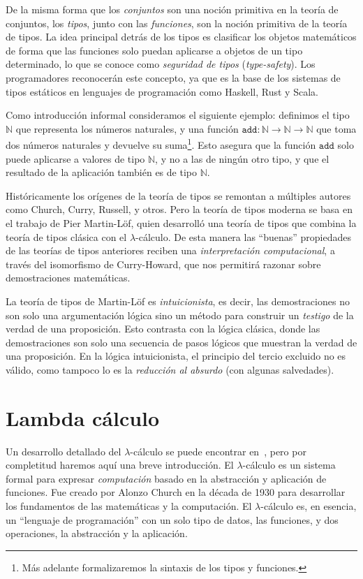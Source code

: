\documentclass[
  a4paper, 
  10pt, 
  parskip=half, 
  toc=bibliography,
]{scrbook}
\theoremstyle{definition}
\theoremstyle{bolddef}
\begin{document}
De la misma forma que los \emph{conjuntos} son una noción primitiva en la teoría de conjuntos,
los \emph{tipos}, junto con las \emph{funciones}, son la noción primitiva de la teoría de tipos.
La idea principal detrás de los tipos es clasificar los objetos matemáticos de
forma que las funciones solo puedan aplicarse a objetos de un tipo determinado,
lo que se conoce como \emph{seguridad de tipos} (\emph{type-safety}). 
Los programadores reconocerán este concepto, ya que es la base de los sistemas de tipos
estáticos en lenguajes de programación como Haskell, Rust y Scala.

Como introducción informal consideramos el siguiente ejemplo: definimos el tipo
\(\mathbb{N}\) que representa los números naturales, y una función
\(\texttt{add}: \mathbb{N} \to \mathbb{N} \to \mathbb{N}\) que toma dos números
naturales y devuelve su suma\footnote{Más adelante formalizaremos la sintaxis de los tipos y funciones.}. 
Esto asegura que la función \(\texttt{add}\) solo puede aplicarse a valores de 
tipo \(\mathbb{N}\), y no a las de ningún otro tipo, y que el resultado de la aplicación
también es de tipo \(\mathbb{N}\).

Históricamente los orígenes de la teoría de tipos se remontan a múltiples
autores como Church, Curry, Russell, y otros. Pero la teoría de tipos moderna se basa en el
trabajo de Pier Martin-Löf, quien desarrolló una teoría de tipos que combina la
teoría de tipos clásica con el \(\lambda\)-cálculo. De esta manera las
\enquote{buenas} propiedades de las teorías de tipos anteriores reciben una
\emph{interpretación computacional}, a través del isomorfismo de Curry-Howard,
que nos permitirá razonar sobre demostraciones matemáticas. 

La teoría de tipos de Martin-Löf es \emph{intuicionista}, es decir, las
demostraciones no son solo una argumentación lógica sino un método para
construir un \emph{testigo} de la verdad de una proposición. Esto contrasta con la lógica
clásica, donde las demostraciones son solo una secuencia de pasos lógicos que
muestran la verdad de una proposición. En la lógica intuicionista, el principio del
tercio excluido no es válido, como tampoco lo es la \emph{reducción al absurdo} (con
algunas salvedades).

\section{Lambda cálculo}

Un desarrollo detallado del \(\lambda\)-cálculo se puede encontrar en~\cite{barendregt1984lambda},
pero por completitud haremos aquí una breve introducción.
El \(\lambda\)-cálculo es un sistema formal para expresar \emph{computación} basado en la
abstracción y aplicación de funciones. 
Fue creado por Alonzo Church en la década de 1930 para desarrollar los fundamentos de las matemáticas y
la computación.
El \(\lambda\)-cálculo es, en esencia, un \enquote{lenguaje de programación} con un solo tipo de datos, las funciones, y
dos operaciones, la abstracción y la aplicación.
\end{document}
